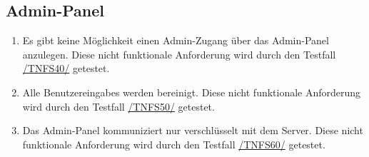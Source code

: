 \subsection*{Admin-Panel}

\begin{samepage}
    \begin{enumerate}[label=\textbf{/NFS\arabic*0/}, align=left, start=4]
        \item \label{/NFS40/} Es gibt keine Möglichkeit einen \Gls{Admin-Zugang} über das \Gls{Admin-Panel} anzulegen. Diese nicht funktionale Anforderung wird durch den Testfall \hyperref[/TNFS40/]{/TNFS40/} getestet.
        \item \label{/NFS50/} Alle \Glspl{Benutzereingabe} werden bereinigt. Diese nicht funktionale Anforderung wird durch den Testfall \hyperref[/TNFS50/]{/TNFS50/} getestet.
        \item \label{/NFS60/} Das \Gls{Admin-Panel} kommuniziert nur verschlüsselt mit dem \Gls{Server}. Diese nicht funktionale Anforderung wird durch den Testfall \hyperref[/TNFS60/]{/TNFS60/} getestet.
    \end{enumerate}
\end{samepage}